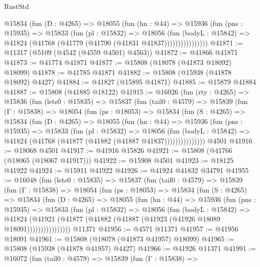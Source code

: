 \begin{lexlean}{RustStd}
\begin{coremodule}
                @15834
                  (fun (D : @4265) =>
                  @18055
                    (fun (hn : @44) =>
                    @15936
                      (fun (pns : @15935) =>
                      @15833
                        (fun (pl : @15832) =>
                        @18056
                          (fun (bodyL : @15842) =>
                          @41824 (@41768 (@41779 (@41790 (@41831 @41837))))))))))))))))
@41871 := @11317 (@5109 (@4542 (@4559 @4501) @4563))
@41872 := @41866 @41871
@41873 := @41774 @41871
@41877 := @15808 (@18078 (@41873 @18092) @18099)
@41878 := @41785 @41871
@41882 := @15808 (@15938 (@41878 @18092) @4427)
@41884 := @41827 (@15895 @41871)
@41885 := @15879 @41884
@41887 := @15808 (@41885 @18122)
@41915 := @16026
    (fun (rty : @4265) =>
    @15836
      (fun (lets0 : @15835) =>
      @15837
        (fun (tail0 : @4579) =>
        @15839
          (fun (Γ : @15838) =>
          @18054
            (fun (ps : @18053) =>
            @15834
              (fun (S : @4265) =>
              @15834
                (fun (D : @4265) =>
                @18055
                  (fun (hn : @44) =>
                  @15936
                    (fun (pns : @15935) =>
                    @15833
                      (fun (pl : @15832) =>
                      @18056
                        (fun (bodyL : @15842) =>
                        @41824 (@41768 (@41877 (@41882 (@41887 @41837)))))))))))))))
    @4501
@41916 := @18068 @4501
@41917 := @41916 @15826
@41921 := @15808 (@41766 (@18065 (@18067 @41917)))
@41922 := @15908 @4501
@41923 := @18125 @41922
@41924 := @15911 @41922
@41926 := @41924 @41832 @34791
@41955 := @16048
    (fun (lets0 : @15835) =>
    @15837
      (fun (tail0 : @4579) =>
      @15839
        (fun (Γ : @15838) =>
        @18054
          (fun (ps : @18053) =>
          @15834
            (fun (S : @4265) =>
            @15834
              (fun (D : @4265) =>
              @18055
                (fun (hn : @44) =>
                @15936
                  (fun (pns : @15935) =>
                  @15833
                    (fun (pl : @15832) =>
                    @18056
                      (fun (bodyL : @15842) =>
                      @41824
                        (@41921
                          (@41877 (@41882 (@41887 (@41923 (@41926 @18089 @18091))))))))))))))))
    @11371
@41956 := @4571 @11371
@41957 := @41956 @18091
@41961 := @15808 (@18078 (@41873 @41957) @18099)
@41965 := @15808 (@15938 (@41878 @41957) @4427)
@41966 := @41926 @11371
@41991 := @16072
    (fun (tail0 : @4579) =>
    @15839
      (fun (Γ : @15838) =>

\end{coremodule}
\end{lexlean}
